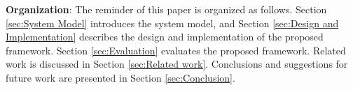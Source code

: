 \documentclass[conference]{IEEEtran/IEEEtran/IEEEtran}
\begin{document}
{\bf Organization}: The reminder of this paper is organized as follows.
Section \ref{sec:System Model} introduces the system model, and Section \ref{sec:Design and Implementation} describes the design and implementation of the proposed framework.
Section \ref{sec:Evaluation} evaluates the proposed framework.
Related work is discussed in Section \ref{sec:Related work}.
Conclusions and suggestions for future work are presented in Section \ref{sec:Conclusion}.



%
%
\end{document}
